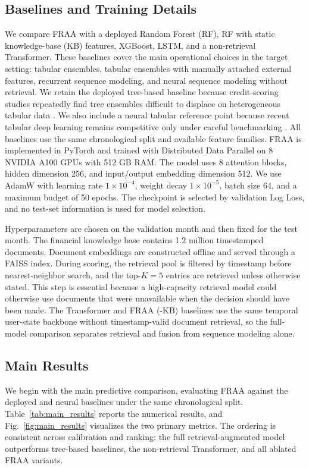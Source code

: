 \documentclass[runningheads]{llncs}
\begin{document}
\subsection{Baselines and Training Details}
We compare FRAA with a deployed Random Forest (RF), RF with static knowledge-base (KB) features, XGBoost, LSTM, and a non-retrieval Transformer. These baselines cover the main operational choices in the target setting: tabular ensembles, tabular ensembles with manually attached external features, recurrent sequence modeling, and neural sequence modeling without retrieval. We retain the deployed tree-based baseline because credit-scoring studies repeatedly find tree ensembles difficult to displace on heterogeneous tabular data \cite{baesens2003benchmarking,brown2012experimental}. We also include a neural tabular reference point because recent tabular deep learning remains competitive only under careful benchmarking \cite{arik2021tabnet}. All baselines use the same chronological split and available feature families. FRAA is implemented in PyTorch and trained with Distributed Data Parallel on 8 NVIDIA A100 GPUs with 512 GB RAM. The model uses 8 attention blocks, hidden dimension 256, and input/output embedding dimension 512. We use AdamW with learning rate $1\times10^{-4}$, weight decay $1\times10^{-5}$, batch size 64, and a maximum budget of 50 epochs. The checkpoint is selected by validation Log Loss, and no test-set information is used for model selection.

Hyperparameters are chosen on the validation month and then fixed for the test month. The financial knowledge base contains 1.2 million timestamped documents. Document embeddings are constructed offline and served through a FAISS index. During scoring, the retrieval pool is filtered by timestamp before nearest-neighbor search, and the top-$K=5$ entries are retrieved unless otherwise stated. This step is essential because a high-capacity retrieval model could otherwise use documents that were unavailable when the decision should have been made. The Transformer and FRAA (-KB) baselines use the same temporal user-state backbone without timestamp-valid document retrieval, so the full-model comparison separates retrieval and fusion from sequence modeling alone.

\subsection{Main Results}

We begin with the main predictive comparison, evaluating FRAA against the deployed and neural baselines under the same chronological split. Table~\ref{tab:main_results} reports the numerical results, and Fig.~\ref{fig:main_results} visualizes the two primary metrics. The ordering is consistent across calibration and ranking: the full retrieval-augmented model outperforms tree-based baselines, the non-retrieval Transformer, and all ablated FRAA variants.
\end{document}
